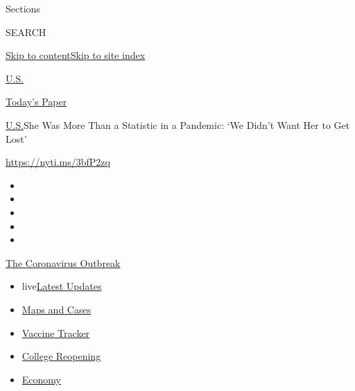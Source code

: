 Sections

SEARCH

\protect\hyperlink{site-content}{Skip to
content}\protect\hyperlink{site-index}{Skip to site index}

\href{https://www.nytimes3xbfgragh.onion/section/us}{U.S.}

\href{https://myaccount.nytimes3xbfgragh.onion/auth/login?response_type=cookie\&client_id=vi}{}

\href{https://www.nytimes3xbfgragh.onion/section/todayspaper}{Today's
Paper}

\href{/section/us}{U.S.}\textbar{}She Was More Than a Statistic in a
Pandemic: `We Didn't Want Her to Get Lost'

\url{https://nyti.ms/3bfP2zq}

\begin{itemize}
\item
\item
\item
\item
\item
\end{itemize}

\href{https://www.nytimes3xbfgragh.onion/news-event/coronavirus?action=click\&pgtype=Article\&state=default\&region=TOP_BANNER\&context=storylines_menu}{The
Coronavirus Outbreak}

\begin{itemize}
\tightlist
\item
  live\href{https://www.nytimes3xbfgragh.onion/2020/08/04/world/coronavirus-covid-19.html?action=click\&pgtype=Article\&state=default\&region=TOP_BANNER\&context=storylines_menu}{Latest
  Updates}
\item
  \href{https://www.nytimes3xbfgragh.onion/interactive/2020/us/coronavirus-us-cases.html?action=click\&pgtype=Article\&state=default\&region=TOP_BANNER\&context=storylines_menu}{Maps
  and Cases}
\item
  \href{https://www.nytimes3xbfgragh.onion/interactive/2020/science/coronavirus-vaccine-tracker.html?action=click\&pgtype=Article\&state=default\&region=TOP_BANNER\&context=storylines_menu}{Vaccine
  Tracker}
\item
  \href{https://www.nytimes3xbfgragh.onion/2020/08/02/us/covid-college-reopening.html?action=click\&pgtype=Article\&state=default\&region=TOP_BANNER\&context=storylines_menu}{College
  Reopening}
\item
  \href{https://www.nytimes3xbfgragh.onion/live/2020/08/03/business/stock-market-today-coronavirus?action=click\&pgtype=Article\&state=default\&region=TOP_BANNER\&context=storylines_menu}{Economy}
\end{itemize}

